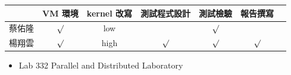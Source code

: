 \documentclass{res}
\begin{document}
\begin{resume}
\vspace*{.1in} 

\begin{tabular}{l | c | c | c | c | c | c}
 & VM 環境 & kernel 改寫 & 測試程式設計 & 測試檢驗 & 報告撰寫 \\ \hline
蔡佑隆 & ${\surd}$ & low &  & ${\surd}$ & \\ \hline
楊翔雲 & ${\surd}$ & high & ${\surd}$ & ${\surd}$ & ${\surd}$\\ \hline
\end{tabular}

\vspace*{.1in} 

\begin{itemize}
    \item Lab 332 Parallel and Distributed Laboratory
\end{itemize}

\end{resume}
\end{document}

